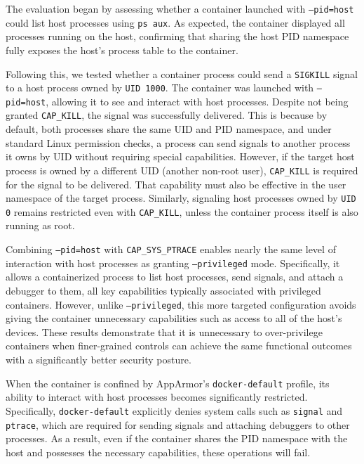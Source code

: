 \documentclass[12pt]{report}
\begin{document}
\begin{doublespace}
The evaluation began by assessing whether a container launched with \texttt{--pid=host} could list host processes using \texttt{ps aux}. As expected, the container displayed all processes running on the host, confirming that sharing the host PID namespace fully exposes the host's process table to the container.

Following this, we tested whether a container process could send a \texttt{SIGKILL} signal to a host process owned by \texttt{UID 1000}. The container was launched with \texttt{--pid=host}, allowing it to see and interact with host processes. Despite not being granted \texttt{CAP\_KILL}, the signal was successfully delivered. This is because by default, both processes share the same UID and PID namespace, and under standard Linux permission checks, a process can send signals to another process it owns by UID without requiring special capabilities. However, if the target host process is owned by a different UID (another non-root user), \texttt{CAP\_KILL} is required for the signal to be delivered. That capability must also be effective in the user namespace of the target process. Similarly, signaling host processes owned by \texttt{UID 0} remains restricted even with \texttt{CAP\_KILL}, unless the container process itself is also running as root.

Combining \texttt{--pid=host} with \texttt{CAP\_SYS\_PTRACE} enables nearly the same level of interaction with host processes as granting \texttt{--privileged} mode. Specifically, it allows a containerized process to list host processes, send signals, and attach a debugger to them, all key capabilities typically associated with privileged containers. However, unlike \texttt{--privileged}, this more targeted configuration avoids giving the container unnecessary capabilities such as access to all of the host's devices. These results demonstrate that it is unnecessary to over-privilege containers when finer-grained controls can achieve the same functional outcomes with a significantly better security posture.

When the container is confined by AppArmor's \texttt{docker-default} profile, its ability to interact with host processes becomes significantly restricted. Specifically, \texttt{docker-default} explicitly denies system calls such as \texttt{signal} and \texttt{ptrace}, which are required for sending signals and attaching debuggers to other processes. As a result, even if the container shares the PID namespace with the host and possesses the necessary capabilities, these operations will fail. 


\end{doublespace}
\end{document}
